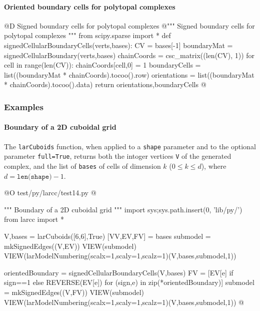\documentclass[11pt,oneside]{article}	%
\begin{document}
\paragraph{Oriented boundary cells for polytopal complexes}

@D Signed boundary cells for polytopal complexes
@{""" Signed boundary cells for polytopal complexes """
from scipy.sparse import *
def signedCellularBoundaryCells(verts,bases):
	CV = bases[-1]
	boundaryMat = signedCellularBoundary(verts,bases)
	chainCoords = csc_matrix((len(CV), 1))
	for cell in range(len(CV)): chainCoords[cell,0] = 1
	boundaryCells = list((boundaryMat * chainCoords).tocoo().row)
	orientations = list((boundaryMat * chainCoords).tocoo().data)
	return orientations,boundaryCells
@}

\subsubsection{Examples}

\paragraph{Boundary of a 2D cuboidal grid}
The \texttt{larCuboids} function, when applied to a \texttt{shape} parameter and to the optional parameter \texttt{full=True}, returns both the intoger vertices \texttt{V} of the generated complex, and the list of \texttt{bases} of cells of dimension $k$ ($0\leq k\leq d$), where $d = \texttt{len(shape)}-1$.

@O test/py/larcc/test14.py
@{""" Boundary of a 2D cuboidal grid """
import sys;sys.path.insert(0, 'lib/py/')
from larcc import *

V,bases = larCuboids([6,6],True)
[VV,EV,FV] = bases
submodel = mkSignedEdges((V,EV))
VIEW(submodel)
VIEW(larModelNumbering(scalx=1,scaly=1,scalz=1)(V,bases,submodel,1))

orientedBoundary = signedCellularBoundaryCells(V,bases)
FV = [EV[e] if sign==1 else REVERSE(EV[e])  for (sign,e) in zip(*orientedBoundary)]
submodel = mkSignedEdges((V,FV))
VIEW(submodel)
VIEW(larModelNumbering(scalx=1,scaly=1,scalz=1)(V,bases,submodel,1))
@}
\end{document}
